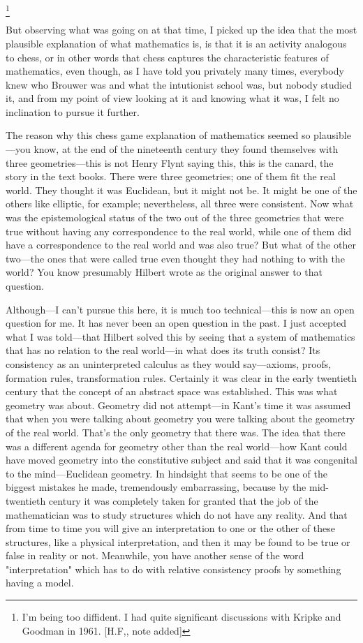 \footnote{I'm being too diffident. I had quite significant discussions with Kripke and Goodman in 1961. [H.F,, note added]}

But observing what was going on at that time, I picked up the idea 
that the most plausible explanation of what mathematics is, is that it is 
an activity analogous to chess, or in other words that chess captures the 
characteristic features of mathematics, even though, as I have told you 
privately many times, everybody knew who Brouwer was and what the 
intutionist school was, but nobody studied it, and from my point of 
view looking at it and knowing what it was, I felt no inclination to 
pursue it further. 

The reason why this chess game explanation of mathematics 
seemed so plausible---you know, at the end of the nineteenth century 
they found themselves with three geometries---this is not Henry Flynt 
saying this, this is the canard, the story in the text books. There were 
three geometries; one of them fit the real world. They thought it was 
Euclidean, but it might not be. It might be one of the others like elliptic, 
for example; nevertheless, all three were consistent. Now what was the 
epistemological status of the two out of the three geometries that were 
true without having any correspondence to the real world, while one of 
them did have a correspondence to the real world and was also true? 
But what of the other two---the ones that were called true even thought 
they had nothing to with the world? You know presumably Hilbert 
wrote  as the original answer to that 
question. 

Although---I can't pursue this here, it is much too technical---this 
is now an open question for me. It has never been an open question in 
the past. I just accepted what I was told---that Hilbert solved this by 
seeing that a system of mathematics that has no relation to the real 
world---in what does its truth consist? Its consistency as an uninterpreted 
calculus as they would say---axioms, proofs, formation rules, 
transformation rules. Certainly it was clear in the early twentieth 
century that the concept of an abstract space was established. This was 
what geometry was about. Geometry did not attempt---in Kant's time it 
was assumed that when you were talking about geometry you were 
talking about the geometry of the real world. That's the only geometry 
that there was. The idea that there was a different agenda for geometry 
other than the real world---how Kant could have moved geometry into 
the constitutive subject and said that it was congenital to the mind---Euclidean geometry. 
In hindsight that seems to be one of the biggest 
mistakes he made, tremendously embarrassing, because by the mid-twentieth 
century it was completely taken for granted that the job of the 
mathematician was to study structures which do not have any reality. 
And that from time to time you will give an interpretation to one or the 
other of these structures, like a physical interpretation, and then it may 
be found to be true or false in reality or not. Meanwhile, you have 
another sense of the word "interpretation" which has to do with relative 
consistency proofs by something having a model. 

